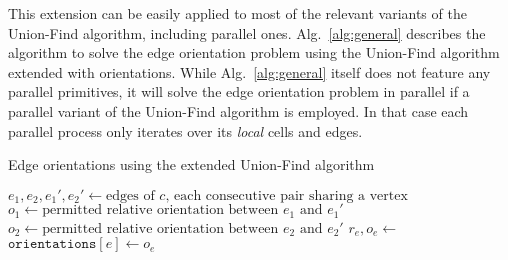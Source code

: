 \documentclass[oneeqnum,onethmnum,onefignum,onetabnum]{siamltex1213}
\begin{document}
This extension can be easily applied to most of the relevant variants
of the Union-Find algorithm, including parallel ones.
Alg.~\ref{alg:general} describes the algorithm to solve the edge
orientation problem using the Union-Find algorithm extended with
orientations. While Alg.~\ref{alg:general} itself does not feature any
parallel primitives, it will solve the edge orientation problem in
parallel if a parallel variant of the Union-Find algorithm
is employed. In that case each parallel process only iterates over its
\emph{local} cells and edges.

\begin{algorithm}
  \caption{Edge orientations using the extended Union-Find algorithm}
  \label{alg:general}
  \begin{algorithmic}[1]
      \State $ e_1, e_2, e_1', e_2' \gets \text{edges of } c \text{, each consecutive pair sharing a vertex} $
      \State $ o_1 \gets \text{permitted relative orientation between } e_1 \text{ and } e_1' $
      \State $ o_2 \gets \text{permitted relative orientation between } e_2 \text{ and } e_2' $
      \State {}
      \State {}
    \EndFor
      \State $ r_e, o_e \gets $ 
      \State $ \mathtt{orientations}[e] \gets o_e $
    \EndFor
  \end{algorithmic}
\end{algorithm}
\end{document}
